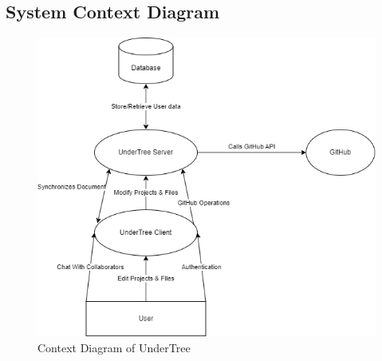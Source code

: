 \documentclass[12pt, titlepage]{article}
\begin{document}
	\subsection{System Context Diagram}
	
	\begin{figure}[H]
		\centering
		\includegraphics[scale=0.7]{system_context.png}
		\caption{Context Diagram of UnderTree}
	\end{figure}
	
	
	
	
	
	
\end{document}
